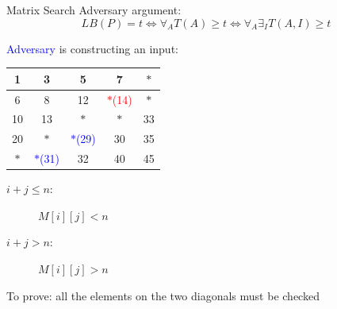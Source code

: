 \documentclass{beamer}
\begin{document}
\begin{frame}{Matrix Search}
  Adversary argument:
  \[
    LB(P) = t \iff \forall_{A} T(A) \geq t \iff \forall_{A} \exists_{I} T(A, I)
    \geq t
  \]

  \textcolor{blue}{Adversary} is constructing an input:
  \begin{table}
	\begin{tabular}{|c|c|c|c|c|}
	  \hline
	  1 	& 3 	& 5 	& 7 	& $\ast$ 	\\ \hline
	  6 	& 8 	& 12 	& \textcolor{red}{$\ast$(14)}	& $\ast$  	\\ \hline
	  10 	& 13 	& $\ast$	& $\ast$ 	& 33  	\\ \hline
	  20 	& $\ast$ 	& \textcolor{blue}{$\ast$(29)} 	& 30 	& 35 	\\ \hline
	  $\ast$ 	& \textcolor{blue}{$\ast$(31)}	& 32 	& 40 	& 45 	\\ \hline
	\end{tabular}
  \end{table}

  \begin{description}
    \item[$i + j \le n:$] $M[i][j] < n$
    \item[$i + j > n:$] $M[i][j] > n$
  \end{description}

  To prove: all the elements on the two diagonals must be checked
\end{frame}
%
%
\end{document}
